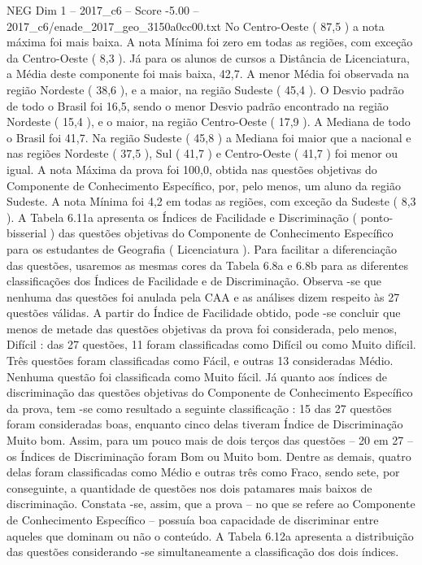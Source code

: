 \begin{textsample}{NEG Dim 1 – 2017\_c6 – Score -5.00 – 2017\_c6/enade\_2017\_geo\_3150a0cc00.txt}
No Centro-Oeste ( 87,5 ) a nota máxima foi mais baixa.
A nota Mínima foi zero em todas as regiões, com exceção da Centro-Oeste ( 8,3 ).
Já para os alunos de cursos a Distância de Licenciatura, a Média deste componente foi mais baixa, 42,7.
A menor Média foi observada na região Nordeste ( 38,6 ), e a maior, na região Sudeste ( 45,4 ).
O Desvio padrão de todo o Brasil foi 16,5, sendo o menor Desvio padrão encontrado na região Nordeste ( 15,4 ), e o maior, na região Centro-Oeste ( 17,9 ).
A Mediana de todo o Brasil foi 41,7.
Na região Sudeste ( 45,8 ) a Mediana foi maior que a nacional e nas regiões Nordeste ( 37,5 ), Sul ( 41,7 ) e Centro-Oeste ( 41,7 ) foi menor ou igual.
A nota Máxima da prova foi 100,0, obtida nas questões objetivas do Componente de Conhecimento Específico, por, pelo menos, um aluno da região Sudeste.
A nota Mínima foi 4,2 em todas as regiões, com exceção da Sudeste ( 8,3 ).
A Tabela 6.11a apresenta os Índices de Facilidade e Discriminação ( ponto-bisserial ) das questões objetivas do Componente de Conhecimento Específico para os estudantes de Geografia ( Licenciatura ).
Para facilitar a diferenciação das questões, usaremos as mesmas cores da Tabela 6.8a e 6.8b para as diferentes classificações dos Índices de Facilidade e de Discriminação.
Observa -se que nenhuma das questões foi anulada pela CAA e as análises dizem respeito às 27 questões válidas.
A partir do Índice de Facilidade obtido, pode -se concluir que menos de metade das questões objetivas da prova foi considerada, pelo menos, Difícil : das 27 questões, 11 foram classificadas como Difícil ou como Muito difícil.
Três questões foram classificadas como Fácil, e outras 13 consideradas Médio.
Nenhuma questão foi classificada como Muito fácil.
Já quanto aos índices de discriminação das questões objetivas do Componente de Conhecimento Específico da prova, tem -se como resultado a seguinte classificação : 15 das 27 questões foram consideradas boas, enquanto cinco delas tiveram Índice de Discriminação Muito bom.
Assim, para um pouco mais de dois terços das questões – 20 em 27 – os Índices de Discriminação foram Bom ou Muito bom.
Dentre as demais, quatro delas foram classificadas como Médio e outras três como Fraco, sendo sete, por conseguinte, a quantidade de questões nos dois patamares mais baixos de discriminação.
Constata -se, assim, que a prova – no que se refere ao Componente de Conhecimento Específico – possuía boa capacidade de discriminar entre aqueles que dominam ou não o conteúdo.
A Tabela 6.12a apresenta a distribuição das questões considerando -se simultaneamente a classificação dos dois índices.

\end{textsample}
